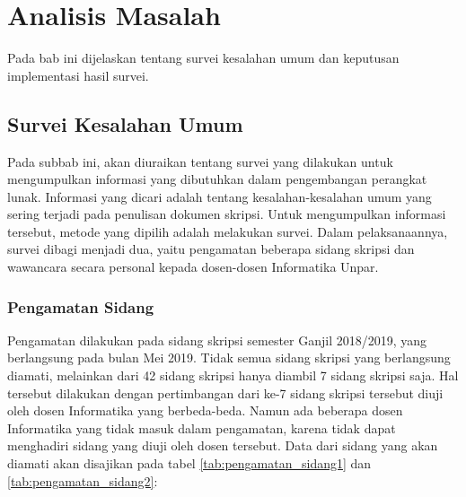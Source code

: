\chapter{Analisis Masalah}
\label{chap:analisis}

Pada bab ini dijelaskan tentang survei kesalahan umum dan keputusan implementasi hasil survei.

\section{Survei Kesalahan Umum}
\label{sec:survei}

Pada subbab ini, akan diuraikan tentang survei yang dilakukan untuk mengumpulkan informasi yang dibutuhkan dalam pengembangan perangkat lunak. Informasi yang dicari adalah tentang kesalahan-kesalahan umum yang sering terjadi pada penulisan dokumen skripsi. Untuk mengumpulkan informasi tersebut, metode yang dipilih adalah melakukan survei. Dalam pelaksanaannya, survei dibagi menjadi dua, yaitu pengamatan beberapa sidang skripsi dan wawancara secara personal kepada dosen-dosen Informatika Unpar. 

\subsection{Pengamatan Sidang}
Pengamatan dilakukan pada sidang skripsi semester Ganjil 2018/2019, yang berlangsung pada bulan Mei 2019. Tidak semua sidang skripsi yang berlangsung diamati, melainkan dari 42 sidang skripsi hanya diambil 7 sidang skripsi saja. Hal tersebut dilakukan dengan pertimbangan dari ke-7 sidang skripsi tersebut diuji oleh dosen Informatika yang berbeda-beda. Namun ada beberapa dosen Informatika yang tidak masuk dalam pengamatan, karena tidak dapat menghadiri sidang yang diuji oleh dosen tersebut. Data dari sidang yang akan diamati akan disajikan pada tabel \ref{tab:pengamatan_sidang1} dan \ref{tab:pengamatan_sidang2}:

